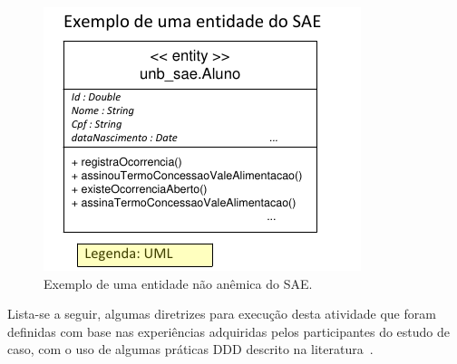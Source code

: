 \begin{figure}[htb]
\centering
\includegraphics[scale=1.4]{img/processo/exemplo_classse_aluno.pdf}
\caption{Exemplo de uma entidade não anêmica do \acrshort{SAE}.}
\label{fig:exemplo_entidade}
\end{figure}





Lista-se a seguir, algumas diretrizes
para execução 
desta atividade que foram definidas
com base nas experiências 
adquiridas pelos participantes do estudo de caso,
com o uso de algumas práticas \acrshort{DDD}
descrito na 
literatura~\cite{balasubramanian2006developing, evans2004domain, fowler2002patterns, vernon2013implementing}. 

